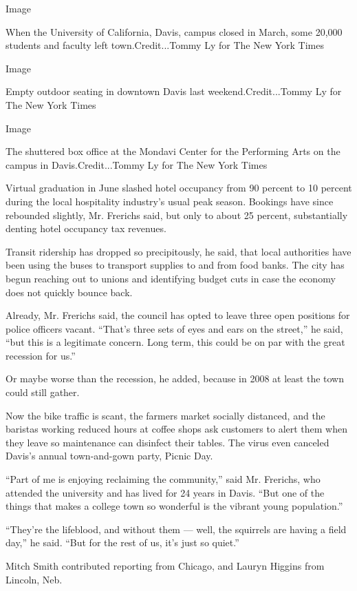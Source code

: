 Image

When the University of California, Davis, campus closed in March, some
20,000 students and faculty left town.Credit...Tommy Ly for The New York
Times

Image

Empty outdoor seating in downtown Davis last weekend.Credit...Tommy Ly
for The New York Times

Image

The shuttered box office at the Mondavi Center for the Performing Arts
on the campus in Davis.Credit...Tommy Ly for The New York Times

Virtual graduation in June slashed hotel occupancy from 90 percent to 10
percent during the local hospitality industry's usual peak season.
Bookings have since rebounded slightly, Mr. Frerichs said, but only to
about 25 percent, substantially denting hotel occupancy tax revenues.

Transit ridership has dropped so precipitously, he said, that local
authorities have been using the buses to transport supplies to and from
food banks. The city has begun reaching out to unions and identifying
budget cuts in case the economy does not quickly bounce back.

Already, Mr. Frerichs said, the council has opted to leave three open
positions for police officers vacant. ``That's three sets of eyes and
ears on the street,'' he said, ``but this is a legitimate concern. Long
term, this could be on par with the great recession for us.''

Or maybe worse than the recession, he added, because in 2008 at least
the town could still gather.

Now the bike traffic is scant, the farmers market socially distanced,
and the baristas working reduced hours at coffee shops ask customers to
alert them when they leave so maintenance can disinfect their tables.
The virus even canceled Davis's annual town-and-gown party, Picnic Day.

``Part of me is enjoying reclaiming the community,'' said Mr. Frerichs,
who attended the university and has lived for 24 years in Davis. ``But
one of the things that makes a college town so wonderful is the vibrant
young population.''

``They're the lifeblood, and without them --- well, the squirrels are
having a field day,'' he said. ``But for the rest of us, it's just so
quiet.''

Mitch Smith contributed reporting from Chicago, and Lauryn Higgins from
Lincoln, Neb.

